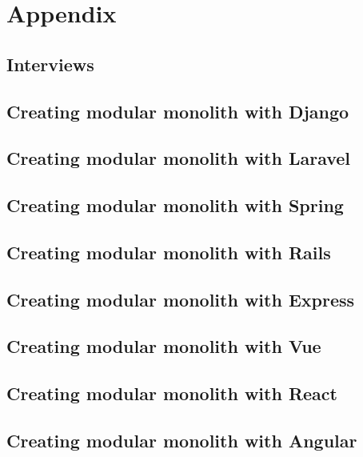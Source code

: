 \chapter{Appendix}

\section{Interviews}


\section{Creating modular monolith with Django}
\label{sec:DjangoImpl}


\section{Creating modular monolith with Laravel}
\label{sec:LaravelImpl}


\section{Creating modular monolith with Spring}
\label{sec:SpringImpl}


\section{Creating modular monolith with Rails}
\label{sec:RailsImpl}


\section{Creating modular monolith with Express}
\label{sec:ExpressImpl}


\section{Creating modular monolith with Vue}
\label{sec:VueImpl}


\section{Creating modular monolith with React}
\label{sec:ReactImpl}


\section{Creating modular monolith with Angular}
\label{sec:AngularImpl}

